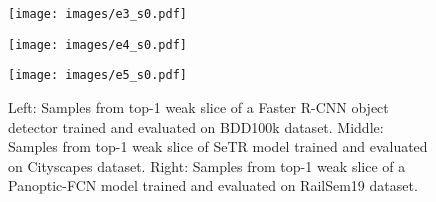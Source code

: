 \begin{figure}[ht]
\begin{minipage}{0.33\textwidth}
  \texttt{[image: images/e3\_s0.pdf]} %
\end{minipage}%
\begin{minipage}{0.33\textwidth}
  \texttt{[image: images/e4\_s0.pdf]} %
\end{minipage}
\begin{minipage}{0.33\textwidth}
  \texttt{[image: images/e5\_s0.pdf]} %
\end{minipage}
  \caption{Left: Samples from top-1 weak slice of a Faster R-CNN object detector trained and evaluated on BDD100k dataset. Middle: Samples from top-1 weak slice of SeTR model trained and evaluated on Cityscapes dataset. Right: Samples from top-1 weak slice of a Panoptic-FCN model trained and evaluated on RailSem19 dataset.}
\label{fig:ad_results}

\end{figure}




